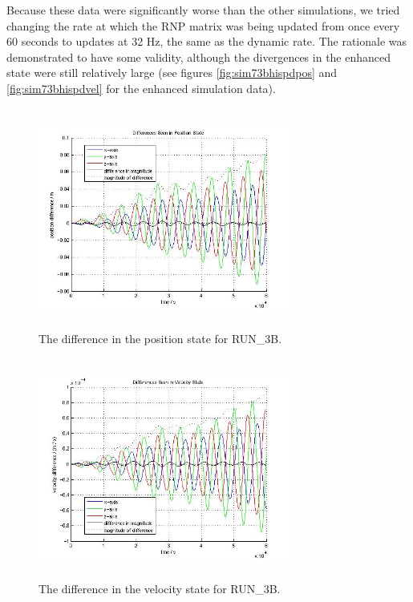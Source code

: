 \begin{description}
Because these data were significantly worse than the other simulations, we 
tried changing the rate at which the RNP matrix was being updated from once 
every 60 seconds to updates at 32 Hz, the same as the dynamic rate.  The 
rationale was demonstrated to have some validity, although the divergences in 
the enhanced state were still relatively large (see figures 
\ref{fig:sim73bhispdpos} and \ref{fig:sim73bhispdvel} for the enhanced 
simulation data).



\begin{figure}[htp]
\begin{center}
\includegraphics[width=3.2736in,height=2.85in]{figures/run3bpos.jpg}
\caption{The difference in the position state for RUN\_3B.}
\label{fig:sim73bpos}
\end{center}
\end{figure}

\begin{figure}[htp]
\begin{center}
\includegraphics[width=3.2736in,height=2.85in]{figures/run3bvel.jpg}
\caption{The difference in the velocity state for RUN\_3B.}
\label{fig:sim73bvel}
\end{center}
\end{figure}


\end{description}
